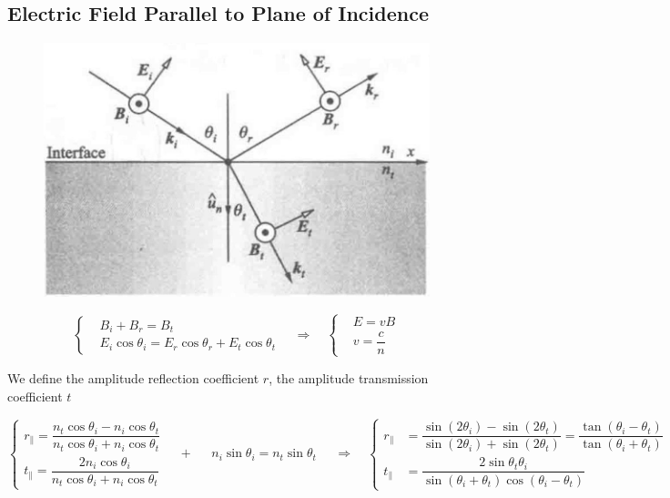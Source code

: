 \subsection{Electric Field Parallel to Plane of Incidence}

\begin{figure}[H]
  \centering
  \includegraphics[width=0.4\linewidth]{figures/Fresnel-parallel}
\end{figure}

\begin{equation*}
 \left\{
  \begin{aligned}
    & B_i + B_r = B_t \\
    & E_i \cos \theta_i = E_r \cos \theta_r + E_t \cos \theta_t
  \end{aligned}
  \right.
  \quad \Rightarrow \quad
  \left\{
  \begin{aligned}
    & E = v B \\
    & v = \dfrac{c}{n}
  \end{aligned}
  \right.
\end{equation*}

We define the amplitude reflection coefficient $r$, the amplitude transmission coefficient $t$

\begin{equation*}
  \left\{
  \begin{aligned}
    r_{\parallel} = \dfrac{n_t \cos \theta_i - n_i \cos \theta_t}{n_t \cos \theta_i + n_i \cos \theta_t} \\
    t_{\parallel} = \dfrac{2 n_i \cos \theta_i}{n_t \cos \theta_i + n_i \cos \theta_t} 
  \end{aligned}
  \right.
  \quad + \quad
  \begin{aligned}
    n_i \sin \theta_i = n_t \sin \theta_t
  \end{aligned}
  \quad \Rightarrow \quad
  \left\{
  \begin{aligned}
    r_{\parallel} &= \dfrac{\sin \left( 2 \theta_i \right) - \sin \left( 2 \theta_t \right)}{\sin \left( 2 \theta_i \right) + \sin \left( 2 \theta_t \right)} = \dfrac{\tan \left( \theta_i - \theta_t \right)}{\tan \left( \theta_i + \theta_t \right)} \\
    t_{\parallel} &= \dfrac{2 \sin \theta_t \theta_i}{\sin \left( \theta_i + \theta_t \right) \cos \left( \theta_i - \theta_t \right)} 
  \end{aligned}
  \right.
\end{equation*}

